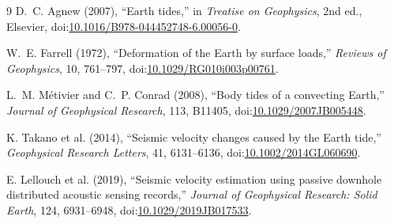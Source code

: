 \documentclass[11pt]{article}
\begin{document}
\begin{thebibliography}{9}
D.~C. Agnew (2007), ``Earth tides,'' in \emph{Treatise on Geophysics},
2nd ed., Elsevier, doi:\href{https://doi.org/10.1016/B978-044452748-6.00056-0}{10.1016/B978-044452748-6.00056-0}.

W.~E. Farrell (1972), ``Deformation of the Earth by surface loads,''
\emph{Reviews of Geophysics}, 10, 761--797,
doi:\href{https://doi.org/10.1029/RG010i003p00761}{10.1029/RG010i003p00761}.

L.~M. M\'etivier and C.~P. Conrad (2008), ``Body tides of a convecting Earth,''
\emph{Journal of Geophysical Research}, 113, B11405,
doi:\href{https://doi.org/10.1029/2007JB005448}{10.1029/2007JB005448}.

K. Takano et al. (2014), ``Seismic velocity changes caused by the Earth tide,''
\emph{Geophysical Research Letters}, 41, 6131--6136,
doi:\href{https://doi.org/10.1002/2014GL060690}{10.1002/2014GL060690}.

E. Lellouch et al. (2019), ``Seismic velocity estimation using passive downhole
distributed acoustic sensing records,'' \emph{Journal of Geophysical Research:
Solid Earth}, 124, 6931--6948,
doi:\href{https://doi.org/10.1029/2019JB017533}{10.1029/2019JB017533}.
\end{thebibliography}
\end{document}
